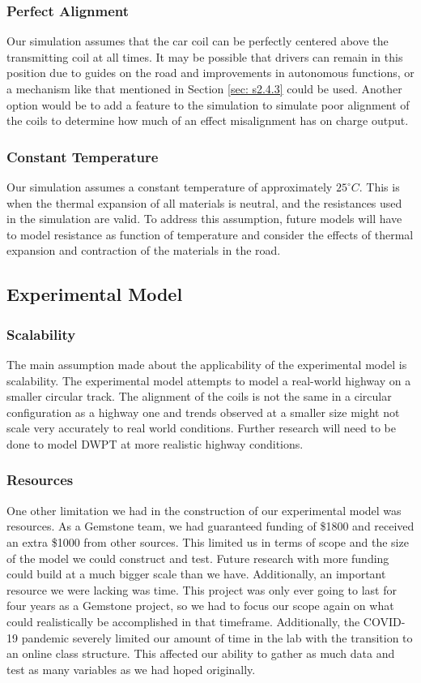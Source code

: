 \subsubsection{Perfect Alignment}
Our simulation assumes that the car coil can be perfectly centered above the transmitting coil at all times. 
It may be possible that drivers can remain in this position due to guides on the road and improvements in 
autonomous functions, or a mechanism like that mentioned in Section \ref{sec: s2.4.3} could be used. 
Another option would be to add a feature to the simulation to simulate poor alignment 
of the coils to determine how much of an effect misalignment has on charge output. 

\subsubsection{Constant Temperature}
Our simulation assumes a constant temperature of approximately $25^{\circ}C$. This is when the thermal 
expansion of all materials is neutral, and the resistances used in the simulation are valid. 
To address this assumption, future models will have to model resistance as function of temperature and 
consider the effects of thermal expansion and contraction of the materials in the road. 

\subsection{Experimental Model}

\subsubsection{Scalability}
The main assumption made about the applicability of the experimental model is scalability. 
The experimental model attempts to model a real-world highway on a smaller circular track. 
The alignment of the coils is not the same in a circular configuration as a highway one and 
trends observed at a smaller size might not scale very accurately to real world conditions. 
Further research will need to be done to model DWPT at more realistic highway conditions.

\subsubsection{Resources}
One other limitation we had in the construction of our experimental model was resources. 
As a Gemstone team, we had guaranteed funding of \$1800 and received an extra \$1000 from other sources. 
This limited us in terms of scope and the size of the model we could construct and test. 
Future research with more funding could build at a much bigger scale than we have. 
Additionally, an important resource we were lacking was time. This project was only ever going 
to last for four years as a Gemstone project, so we had to focus our scope again on what could 
realistically be accomplished in that timeframe. Additionally, the COVID-19 pandemic severely 
limited our amount of time in the lab with the transition to an online class structure. 
This affected our ability to gather as much data and test as many variables as we had hoped originally.

